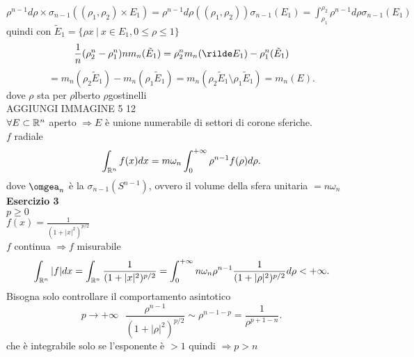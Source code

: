 \documentclass[12px]{article}
\begin{document}
$\rho^{n-1}d\rho\times\sigma_{n-1}((\rho_1,\rho_2)\times E_1)= \rho^{n-1}d\rho((\rho_1,\rho_2))\sigma_{n-1}(E_1)=	\displaystyle \int_{\rho_1}^{\rho_2}\rho^{n-1}d\rho\sigma_{n-1}(E_1)$
quindi con $\tilde E_1 = \{\rho x\ | \ x\in E_1, 0\leq \rho \leq 1\}$
\[
	\frac 1n  (\rho_2^n-\rho_1^n ) nm_n(\tilde E_1) = \rho_2^n m_n(\rilde E_1) - \rho^n_1(\tilde E_1) 
\] 
\[
= m_n(\rho_2\tilde E_1) - m_n(\rho_1 \tilde E_1) = m_n(\rho_2\tilde E_1\setminus \rho_1 \tilde E_1) = m_n(E)
.\] 
dove $\rho $ sta per  $\rho$lberto $\rho$gostinelli \\
AGGIUNGI IMMAGINE 5 12\\
$\forall E\subset \mathbb{R}^n$ aperto  $ \Rightarrow  E$ è unione numerabile di settori di corone sferiche.\\
$f$ radiale
\[
	\int_{\mathbb{R}^n}f(x)dx = m\omega_n\int_0^{+\infty}\rho^{n-1}f(\rho)d\rho
.\] 
dove $\omgea_n$  è la  $\sigma_{n-1}(S^{n-1})$, ovvero il volume della sfera unitaria  $= n\omega_n$ \\
\textbf{Esercizio 3}\\
$p\geq 0$ \\
$f(x) = \frac {1}{(1 + |x|^2)^{p/2}}$ \\
$f$ continua  $ \Rightarrow  f$ misurabile
\[
	\int_{\mathbb{R}^n}|f|dx =\int_{\mathbb{R}^n} \frac{1}{(1 + |x|^2)^{p/2}} = \int_0^{+\infty}n\omega_n\rho^{n-1}\frac{1}{(1 + |\rho|^2)^{p/2}}d\rho < +\infty
.\] 
Bisogna solo controllare il comportamento asintotico
\[
	p \rightarrow +\infty\ \ \  \frac{\rho^{n-1}}{(1 + |\rho|^2)^{p/2}}\sim \rho^{n-1-p} = \frac { 1}{\rho^{p+1-n}}
.\] 
che è integrabile solo se l'esponente è $>1$ quindi  $ \Rightarrow  p > n$
\end{document}
